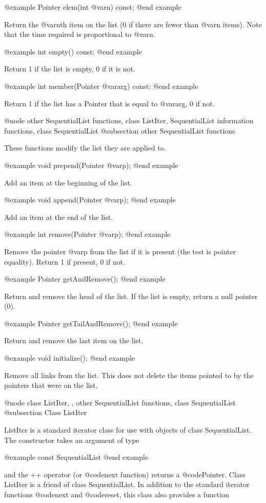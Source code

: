 @example
Pointer elem(int @var{n}) const;
@end example

Return the @var{n}th item on the list (0 if there are fewer than @var{n} items).
Note that the time required is proportional to @var{n}.

@example
int empty() const;
@end example

Return 1 if the list is empty, 0 if it is not.

@example
int member(Pointer @var{arg}) const;
@end example

Return 1 if the list has a Pointer that is equal to @var{arg}, 0 if not.

@node other SequentialList functions, class ListIter, SequentialList information functions, class SequentialList
@subsection other SequentialList functions

These functions modify the list they are applied to.

@example
void prepend(Pointer @var{p});
@end example

Add an item at the beginning of the list.

@example
void append(Pointer @var{p});
@end example

Add an item at the end of the list.

@example
int remove(Pointer @var{p});
@end example

Remove the pointer @var{p} from the list if it is present (the test is pointer
equality).  Return 1 if present, 0 if not.

@example
Pointer getAndRemove();
@end example

Return and remove the head of the list.  If the list is empty, return
a null pointer (0).

@example
Pointer getTailAndRemove();
@end example

Return and remove the last item on the list.

@example
void initialize();
@end example

Remove all links from the list.  This does not delete the items pointed
to by the pointers that were on the list.

@node class ListIter,  , other SequentialList functions, class SequentialList
@subsection Class ListIter

ListIter is a standard iterator class for use with objects of class
SequentialList.  The constructor takes an argument of type

@example
const SequentialList
@end example

and the ++ operator (or @code{next} function) returns a @code{Pointer}.
Class ListIter is a friend of class SequentialList.
In addition to the standard iterator functions @code{next} and
@code{reset}, this class also provides a function

